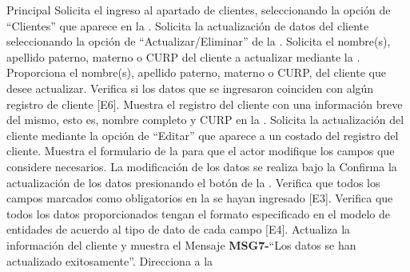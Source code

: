 	\begin{UCtrayectoria}{Principal}
		\UCpaso[\UCactor] Solicita el ingreso al apartado de clientes, seleccionando la opción de ``Clientes'' que aparece en la .
		\UCpaso[\UCactor] Solicita la actualización de datos del cliente seleccionando la opción de ``Actualizar/Eliminar'' de la .
		\UCpaso Solicita el nombre(s), apellido paterno, materno o CURP del cliente a actualizar mediante la .
		\UCpaso[\UCactor] Proporciona el nombre(s), apellido paterno, materno o CURP, del cliente que desee actualizar.
		\UCpaso Verifica si los datos que se ingresaron coinciden con algún registro de cliente [E6].
		\UCpaso Muestra el registro del cliente con una información breve del mismo, esto es, nombre completo y CURP en la .
		\UCpaso[\UCactor] Solicita la actualización del cliente mediante la opción de ``Editar'' que aparece a un costado del registro del cliente.
		\UCpaso Muestra el formulario de la  para que el actor modifique los campos que considere necesarios. La modificación de los datos se realiza bajo la  
		\UCpaso[\UCactor] Confirma la actualización de los datos presionando el botón  de la .
		\UCpaso Verifica que todos los campos marcados como obligatorios en la  se hayan ingresado [E3].
		\UCpaso Verifica que todos los datos proporcionados tengan el formato especificado en el modelo de entidades de acuerdo al tipo de dato de cada campo [E4].
		\UCpaso Actualiza la información del cliente y muestra el Mensaje {\bf MSG7-}``Los datos se han actualizado exitosamente''.
		\UCpaso Direcciona a la 
	\end{UCtrayectoria}
	

	

		

	
